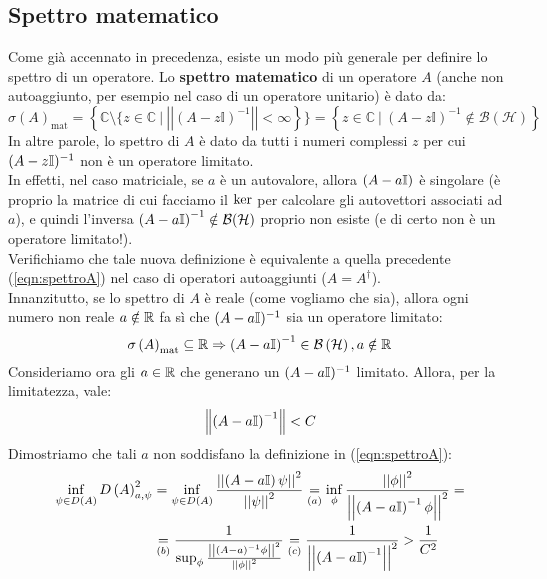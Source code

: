 \documentclass[../../FisicaTeorica.tex]{subfiles}
\begin{document}
\subsection{Spettro matematico}
\begin{comment}
Abbiamo definito lo spettro di un'osservabile $O$ descritta dall'operatore $A$ come:
\begin{equation}
\sigma \left(A\right)= \left\{a\in\mathbb{R}\ |\inf_{\psi\in D\left(A\right)}{\left(\Delta A\right)_{a,\psi}=0}\right\}
\label{eqn:spettroA}
\end{equation}
\end{comment}
Come già accennato in precedenza, esiste un modo più generale per definire lo spettro di un operatore. Lo \textbf{spettro matematico} di un operatore $A$ (anche non autoaggiunto, per esempio nel caso di un operatore unitario) è dato da:
\[
\sigma \left(A\right)_{\text{mat}}= \left\{\mathbb{C}\setminus \{ z\in\mathbb{C}\ |\ \left|\left|\left(A-z\mathbb{I}\right)^{-1}\right|\right|<\infty\right\}\}
=\left\{z\in\mathbb{C}\ |\
\left(A-z\mathbb{I}\right)^{-1}\notin\mathcal{B}(\mathcal{H})\right\}
\]
In altre parole, lo spettro di $A$ è dato da tutti i numeri complessi $z$ per cui $(A-z\mathbb{I})^{-1}$ non è un operatore limitato.\\
In effetti, nel caso matriciale, se $a$ è un autovalore, allora $(A-a\mathbb{I})$ è singolare (è proprio la matrice di cui facciamo il $\operatorname{ker}$ per calcolare gli autovettori associati ad $a$), e quindi l'inversa $\left(A-a\mathbb{I}\right)^{-1}\notin \mathcal{B}(\mathcal{H})$ proprio non esiste (e di certo non è un operatore limitato!).\\
Verifichiamo che tale nuova definizione è equivalente a quella precedente (\ref{eqn:spettroA}) nel caso di operatori autoaggiunti ($A=A^\dag$).\\
Innanzitutto, se lo spettro di $A$ è reale (come vogliamo che sia), allora ogni numero non reale $a\notin \mathbb{R}$ fa sì che $(A-a\mathbb{I})^{-1}$ sia un operatore limitato:
\[ \sigma \left(A\right)_{\text{mat}}\subseteq \mathbb{R} \Rightarrow \left(A-a\mathbb{I}\right)^{-1}\in \mathcal{B}\left(\mathcal{H}\right), a\notin \mathbb{R} 
\]
Consideriamo ora gli $a\in \mathbb{R}$ che generano un $(A-a\mathbb{I})^{-1}$ limitato. Allora, per la limitatezza, vale:
\[
\left\lVert\left(A-a\mathbb{I}\right)^{-1}\right\rVert<C
\]
Dimostriamo che tali $a$ non soddisfano la definizione in (\ref{eqn:spettroA}):
\begin{align*}
\inf_{\psi\in D\left(A\right)}{D\left(A\right)_{a,\psi}^2}
&=\inf_{\psi\in D\left(A\right)}{\frac{\left|\left|\left(A-a\mathbb{I}\right)\psi\right|\right|^2}{\left|\left|\psi\right|\right|^2}}
\underset{(a)}{=}\inf_\phi{\frac{\left|\left|\phi\right|\right|^2}{\left|\left|\left(A-a\mathbb{I}\right)^{-1}\phi\right|\right|^2}}=\\
&\underset{(b)}{=}\frac{1}{\sup_\phi{\frac{\left|\left|\left(A-a\right)^{-1}\phi\right|\right|^2}{\left|\left|\phi\right|\right|^2}}}\underset{(c)}{=}\frac{1}{\left|\left|\left(A-a\mathbb{I}\right)^{-1}\right|\right|^2}>\frac{1}{C^2}
\end{align*}
\end{document}
